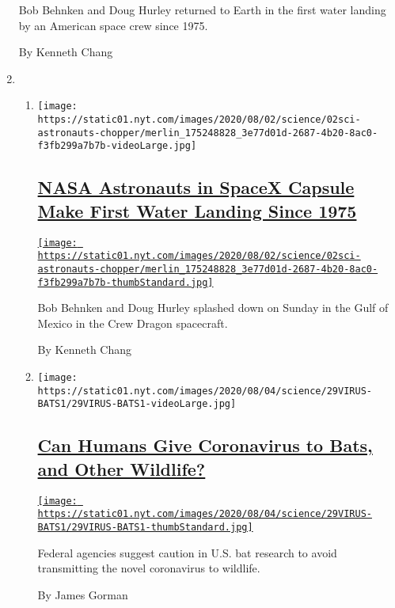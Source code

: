 \begin{enumerate}
  Bob Behnken and Doug Hurley returned to Earth in the first water
  landing by an American space crew since 1975.

  By Kenneth Chang
\item
  \begin{enumerate}
  \def\labelenumii{\arabic{enumii}.}
  \item
    \texttt{[image: https://static01.nyt.com/images/2020/08/02/science/02sci-astronauts-chopper/merlin\_175248828\_3e77d01d-2687-4b20-8ac0-f3fb299a7b7b-videoLarge.jpg]}

    \hypertarget{nasa-astronauts-in-spacex-capsule-make-first-water-landing-since-1975}{%
    \subsection{\texorpdfstring{\href{/2020/08/02/science/spacex-nasa-return.html}{NASA
    Astronauts in SpaceX Capsule Make First Water Landing Since
    1975}}{NASA Astronauts in SpaceX Capsule Make First Water Landing Since 1975}}\label{nasa-astronauts-in-spacex-capsule-make-first-water-landing-since-1975}}

    \href{/2020/08/02/science/spacex-nasa-return.html}{\texttt{[image: https://static01.nyt.com/images/2020/08/02/science/02sci-astronauts-chopper/merlin\_175248828\_3e77d01d-2687-4b20-8ac0-f3fb299a7b7b-thumbStandard.jpg]}}

    Bob Behnken and Doug Hurley splashed down on Sunday in the Gulf of
    Mexico in the Crew Dragon spacecraft.

    By Kenneth Chang
  \item
    \texttt{[image: https://static01.nyt.com/images/2020/08/04/science/29VIRUS-BATS1/29VIRUS-BATS1-videoLarge.jpg]}

    \hypertarget{can-humans-give-coronavirus-to-bats-and-other-wildlife}{%
    \subsection{\texorpdfstring{\href{/2020/08/01/science/Covid-bats.html}{Can
    Humans Give Coronavirus to Bats, and Other
    Wildlife?}}{Can Humans Give Coronavirus to Bats, and Other Wildlife?}}\label{can-humans-give-coronavirus-to-bats-and-other-wildlife}}

    \href{/2020/08/01/science/Covid-bats.html}{\texttt{[image: https://static01.nyt.com/images/2020/08/04/science/29VIRUS-BATS1/29VIRUS-BATS1-thumbStandard.jpg]}}

    Federal agencies suggest caution in U.S. bat research to avoid
    transmitting the novel coronavirus to wildlife.

    By James Gorman
  \end{enumerate}
\end{enumerate}

